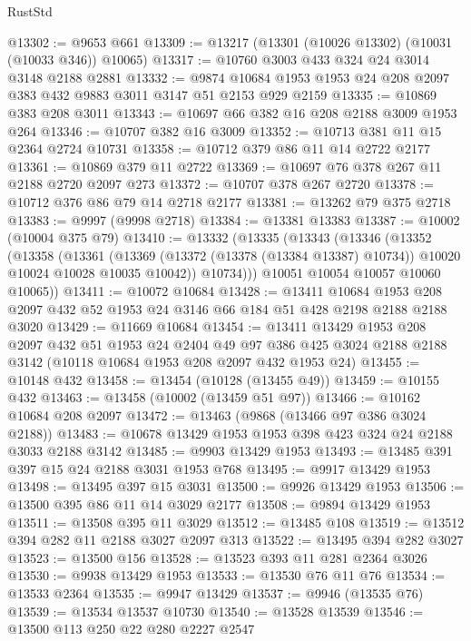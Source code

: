 \begin{lexlean}{RustStd}
\begin{coremodule}
@13302 := @9653 @661
@13309 := @13217 (@13301 (@10026 @13302) (@10031 (@10033 @346)) @10065)
@13317 := @10760 @3003 @433 @324 @24 @3014 @3148 @2188 @2881
@13332 := @9874 @10684 @1953 @1953 @24 @208 @2097 @383 @432 @9883 @3011 @3147 @51 @2153 @929 @2159
@13335 := @10869 @383 @208 @3011
@13343 := @10697 @66 @382 @16 @208 @2188 @3009 @1953 @264
@13346 := @10707 @382 @16 @3009
@13352 := @10713 @381 @11 @15 @2364 @2724 @10731
@13358 := @10712 @379 @86 @11 @14 @2722 @2177
@13361 := @10869 @379 @11 @2722
@13369 := @10697 @76 @378 @267 @11 @2188 @2720 @2097 @273
@13372 := @10707 @378 @267 @2720
@13378 := @10712 @376 @86 @79 @14 @2718 @2177
@13381 := @13262 @79 @375 @2718
@13383 := @9997 (@9998 @2718)
@13384 := @13381 @13383
@13387 := @10002 (@10004 @375 @79)
@13410 := @13332
    (@13335
      (@13343
        (@13346
          (@13352
            (@13358
              (@13361
                (@13369
                  (@13372 (@13378 (@13384 @13387) @10734))
                  @10020
                  @10024
                  @10028
                  @10035
                  @10042))
              @10734)))
        @10051
        @10054
        @10057
        @10060
        @10065))
@13411 := @10072 @10684
@13428 := @13411
    @10684
    @1953
    @208
    @2097
    @432
    @52
    @1953
    @24
    @3146
    @66
    @184
    @51
    @428
    @2198
    @2188
    @2188
    @3020
@13429 := @11669 @10684
@13454 := @13411
    @13429
    @1953
    @208
    @2097
    @432
    @51
    @1953
    @24
    @2404
    @49
    @97
    @386
    @425
    @3024
    @2188
    @2188
    @3142
    (@10118 @10684 @1953 @208 @2097 @432 @1953 @24)
@13455 := @10148 @432
@13458 := @13454 (@10128 (@13455 @49))
@13459 := @10155 @432
@13463 := @13458 (@10002 (@13459 @51 @97))
@13466 := @10162 @10684 @208 @2097
@13472 := @13463 (@9868 (@13466 @97 @386 @3024 @2188))
@13483 := @10678 @13429 @1953 @1953 @398 @423 @324 @24 @2188 @3033 @2188 @3142
@13485 := @9903 @13429 @1953
@13493 := @13485 @391 @397 @15 @24 @2188 @3031 @1953 @768
@13495 := @9917 @13429 @1953
@13498 := @13495 @397 @15 @3031
@13500 := @9926 @13429 @1953
@13506 := @13500 @395 @86 @11 @14 @3029 @2177
@13508 := @9894 @13429 @1953
@13511 := @13508 @395 @11 @3029
@13512 := @13485 @108
@13519 := @13512 @394 @282 @11 @2188 @3027 @2097 @313
@13522 := @13495 @394 @282 @3027
@13523 := @13500 @156
@13528 := @13523 @393 @11 @281 @2364 @3026
@13530 := @9938 @13429 @1953
@13533 := @13530 @76 @11 @76
@13534 := @13533 @2364
@13535 := @9947 @13429
@13537 := @9946 (@13535 @76)
@13539 := @13534 @13537 @10730
@13540 := @13528 @13539
@13546 := @13500 @113 @250 @22 @280 @2227 @2547

\end{coremodule}
\end{lexlean}
